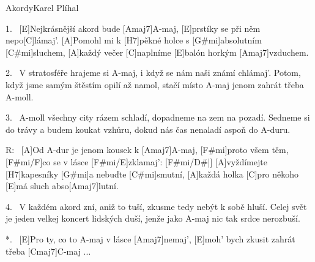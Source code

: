 \begin{song}{Akordy}{Karel Plíhal}

\begin{xverse}{1.~}
[E]Nejkrásnější akord bude [Amaj7]A-maj,
[E]prstíky se při něm nepo[C]lámaj'.
[A]Pomohl mi k [H7]pěkné holce s [G#mi]absolutním [C#mi]sluchem,
[A]každý večer [C]naplníme [E]balón horkým [Amaj7]vzduchem.
\end{xverse}

\begin{xverse}{2.~}
V stratosféře hrajeme si A-maj,
i když se nám naši známí chlámaj'.
Potom, když jsme samým štěstím opilí až namol,
stačí místo A-maj jenom zahrát třeba A-moll.
\end{xverse}

\begin{xverse}{3.~}
A-moll všechny city rázem schladí,
dopadneme na zem na pozadí.
Sedneme si do trávy a budem koukat vzhůru,
dokud nás čas nenaladí aspoň do A-duru.
\end{xverse}

\begin{xverse}{R:~}
[A]Od A-dur je jenom kousek k [Amaj7]A-maj,
[F#mi]proto všem těm, [F#mi/F]co se v lásce [F#mi/E]zklamaj': [F#mi/D#|]{}
[A]vyždímejte [H7]kapesníky [G#mi]a nebuďte [C#mi]smutní,
[A]každá holka [C]pro někoho [E]má sluch abso[Amaj7]lutní.
\end{xverse}

\begin{xverse}{4.~}
V každém akord zní, aniž to tuší,
zkusme tedy nebýt k sobě hluší.
Celej svět je jeden velkej koncert lidských duší,
jenže jako A-maj nic tak srdce nerozbuší.
\end{xverse}

\begin{xverse}{*.~}
[E]Pro ty, co to A-maj v lásce [Amaj7]nemaj',
[E]moh' bych zkusit zahrát třeba [Cmaj7]C-maj ...
\end{xverse}

\end{song}


